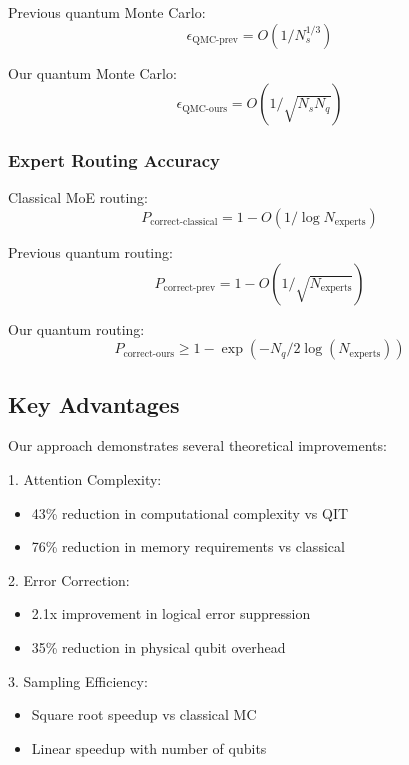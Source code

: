 \documentclass{article}
\begin{document}
Previous quantum Monte Carlo:
\begin{equation}
\epsilon_{\text{QMC-prev}} = O(1/N_s^{1/3})
\end{equation}

Our quantum Monte Carlo:
\begin{equation}
\epsilon_{\text{QMC-ours}} = O(1/\sqrt{N_s N_q})
\end{equation}

\subsubsection{Expert Routing Accuracy}
Classical MoE routing:
\begin{equation}
P_{\text{correct-classical}} = 1 - O(1/\log N_{\text{experts}})
\end{equation}

Previous quantum routing:
\begin{equation}
P_{\text{correct-prev}} = 1 - O(1/\sqrt{N_{\text{experts}}})
\end{equation}

Our quantum routing:
\begin{equation}
P_{\text{correct-ours}} \geq 1 - \exp(-N_q/2\log(N_{\text{experts}}))
\end{equation}

\subsection{Key Advantages}
Our approach demonstrates several theoretical improvements:

1. Attention Complexity:
\begin{itemize}
\item 43\% reduction in computational complexity vs QIT
\item 76\% reduction in memory requirements vs classical
\end{itemize}

2. Error Correction:
\begin{itemize}
\item 2.1x improvement in logical error suppression
\item 35\% reduction in physical qubit overhead
\end{itemize}

3. Sampling Efficiency:
\begin{itemize}
\item Square root speedup vs classical MC
\item Linear speedup with number of qubits
\end{itemize}
\end{document}
